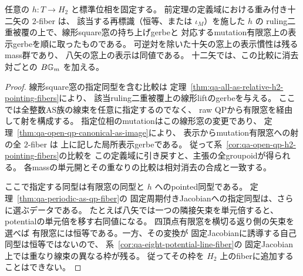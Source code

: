 \begin{corollary}
\label{cor:qa-avatar-all-presented-pointing-fiber}
任意の $h:T\to H_2$ と標準位相を固定する。
前定理の定義域における重み付き十二矢の $2$-fiber は、
該当する再標識（恒等、または $\iota_M$）を施した $h$ の
ruling二重被覆の上で、線形square窓の持ち上げgerbeと
対応するmutation有限窓上の表示gerbeを順に取ったものである。
可逆対を除いた十矢の窓上の表示慣性は残るmass群であり、
八矢の窓上の表示は同値である。
十二矢では、この比較に消去対ごとの $B\mathbb G_m$ を加える。
\end{corollary}
\begin{proof}
線形square窓の指定同型を含む比較は
定理~\ref{thm:qa-all-as-relative-h2-pointing-fibers}により、
該当ruling二重被覆上の線形liftのgerbeを与える。
ここでは全整数AS族の線束を任意に指定するのでなく、
raw QPから有限窓を経由して射を構成する。
指定位相のmutationはこの線形窓の変更であり、
定理~\ref{thm:qa-open-qp-canonical-as-image}により、
表示からmutation有限窓への射の全 $2$-fiber は
上に記した局所表示gerbeである。
従って系~\ref{cor:qa-open-qp-h2-pointing-fibers}の比較を
この定義域に引き戻すと、主張の全groupoidが得られる。
各massの単元開とその重なりの比較は相対消去の合成と一致する。

ここで指定する同型は有限窓の同型と $h$ へのpointed同型である。
定理~\ref{thm:qa-periodic-as-qp-fiber}の
固定周期付きJacobianへの指定同型は、さらに選ぶデータである。
たとえば八矢では一つの隣接矢束を単元倍すると、
potentialの単元倍を移す右同値になる。
四頂点有限窓を横切る返り側の矢束を選べば
有限窓には恒等である。一方、その変換が
固定Jacobianに誘導する自己同型は恒等ではないので、
系~\ref{cor:qa-eight-potential-line-fiber}の
固定Jacobian上では重なり線束の異なる枠が残る。
従ってその枠を $H_2$ 上のfiberに追加することはできない。
\end{proof}

